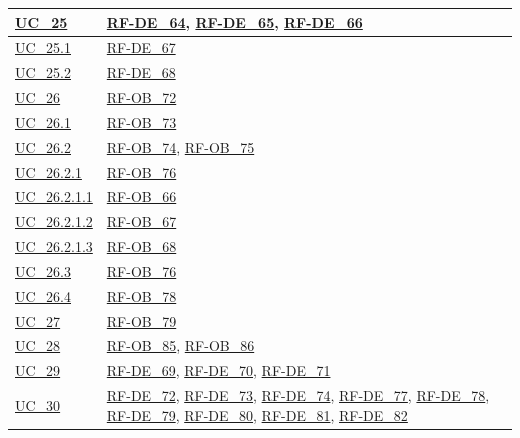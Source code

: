 \begin{longtable}{|
        >{\raggedright\arraybackslash}p{} |
        >{\raggedright\arraybackslash}p{} |
    }
    \hyperref[uc_25]{UC\_25} & \hyperlink{rf-de_64}{RF-DE\_64}, \hyperlink{rf-de_65}{RF-DE\_65}, \hyperlink{rf-de_66}{RF-DE\_66} \\
    \hline
    \hyperref[uc_25.1]{UC\_25.1} & \hyperlink{rf-de_67}{RF-DE\_67} \\
    \hline
    \hyperref[uc_25.2]{UC\_25.2} & \hyperlink{rf-de_68}{RF-DE\_68} \\
    \hline

    \hyperref[uc_26]{UC\_26} & \hyperlink{rf-ob_72}{RF-OB\_72} \\
    \hline
    \hyperref[uc_26.1]{UC\_26.1} & \hyperlink{rf-ob_73}{RF-OB\_73} \\
    \hline
    \hyperref[uc_26.2]{UC\_26.2} & \hyperlink{rf-ob_74}{RF-OB\_74}, \hyperlink{rf-ob_75}{RF-OB\_75} \\
    \hline
    \hyperref[uc_26.2.1]{UC\_26.2.1} & \hyperlink{rf-ob_76}{RF-OB\_76} \\
    \hline
    \hyperref[uc_26.2.1.1]{UC\_26.2.1.1} & \hyperlink{rf-ob_66}{RF-OB\_66} \\
    \hline
    \hyperref[uc_26.2.1.2]{UC\_26.2.1.2} & \hyperlink{rf-ob_67}{RF-OB\_67} \\
    \hline
    \hyperref[uc_26.2.1.3]{UC\_26.2.1.3} & \hyperlink{rf-ob_68}{RF-OB\_68} \\
    \hline
    \hyperref[uc_26.3]{UC\_26.3} & \hyperlink{rf-ob_76}{RF-OB\_76} \\
    \hline
    \hyperref[uc_26.4]{UC\_26.4} & \hyperlink{rf-ob_78}{RF-OB\_78} \\
    \hline

    \hyperref[uc_27]{UC\_27} & \hyperlink{rf-ob_79}{RF-OB\_79} \\
    \hline

    \hyperref[uc_28]{UC\_28} & \hyperlink{rf-ob_85}{RF-OB\_85}, \hyperlink{rf-ob_86}{RF-OB\_86} \\
    \hline

    \hyperref[uc_29]{UC\_29} & \hyperlink{rf-de_69}{RF-DE\_69}, \hyperlink{rf-de_70}{RF-DE\_70}, \hyperlink{rf-de_71}{RF-DE\_71} \\
    \hline

    \hyperref[uc_30]{UC\_30} & \hyperlink{rf-de_72}{RF-DE\_72}, \hyperlink{rf-de_73}{RF-DE\_73}, \hyperlink{rf-de_74}{RF-DE\_74}, \hyperlink{rf-de_77}{RF-DE\_77}, \hyperlink{rf-de_78}{RF-DE\_78}, \hyperlink{rf-de_79}{RF-DE\_79}, \hyperlink{rf-de_80}{RF-DE\_80}, \hyperlink{rf-de_81}{RF-DE\_81}, \hyperlink{rf-de_82}{RF-DE\_82} \\
    \hline


\end{longtable}
